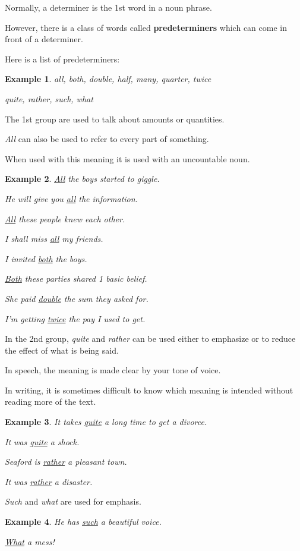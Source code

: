 \documentclass[oneside]{book}
\numberwithin{equation}{section}
\newtheorem{example}{Example}[section]
\begin{document}
%
\noindent{} Normally, a determiner is the 1st word in a noun phrase.

However, there is a class of words called \textbf{predeterminers} which can come in front of a determiner.

%
Here is a list of predeterminers:
\begin{example}
    all, both, double, half, many, quarter, twice
    
    quite, rather, such, what
\end{example}
The 1st group are used to talk about amounts or quantities.

\textit{All} can also be used to refer to every part of something.

When used with this meaning it is used with an uncountable noun.
\begin{example}
    \underline{All} the boys started to giggle.
    
    He will give you \underline{all} the information.
    
    \underline{All} these people knew each other.
    
    I shall miss \underline{all} my friends.
    
    I invited \underline{both} the boys.
    
    \underline{Both} these parties shared 1 basic belief.
    
    She paid \underline{double} the sum they asked for.
    
    I'm getting \underline{twice} the pay I used to get.
\end{example}
In the 2nd group, \textit{quite} and \textit{rather} can be used either to emphasize or to reduce the effect of what is being said.

In speech, the meaning is made clear by your tone of voice.

In writing, it is sometimes difficult to know which meaning is intended without reading more of the text.
\begin{example}
    It takes \underline{quite} a long time to get a divorce.
    
    It was \underline{quite} a shock.
    
    Seaford is \underline{rather} a pleasant town.
    
    It was \underline{rather} a disaster.
\end{example}
\textit{Such} and \textit{what} are used for emphasis.
\begin{example}
    He has \underline{such} a beautiful voice.
    
    \underline{What} a mess!
\end{example}
\end{document}
